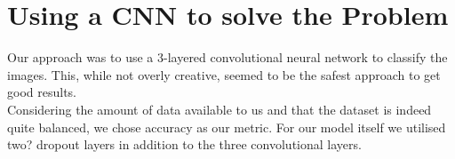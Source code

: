 \chapter{Using a CNN to solve the Problem}
\label{ch:solution}

Our approach was to use a $3$-layered convolutional neural network to classify the images.
This, while not overly creative, seemed to be the safest approach to get good results. \\

Considering the amount of data available to us and that the dataset is indeed quite balanced, we chose accuracy as our metric.
For our model itself we utilised two? dropout layers in addition to the three convolutional layers.